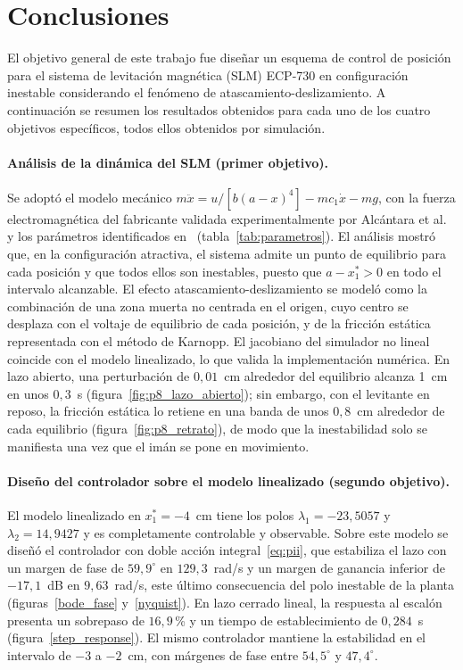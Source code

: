 \section{Conclusiones}

El objetivo general de este trabajo fue diseñar un esquema de control de posición para el sistema de levitación magnética (SLM) ECP-730 en configuración inestable considerando el fenómeno de atascamiento-deslizamiento. A continuación se resumen los resultados obtenidos para cada uno de los cuatro objetivos específicos, todos ellos obtenidos por simulación.

\paragraph{Análisis de la dinámica del SLM (primer objetivo).}
Se adoptó el modelo mecánico $m\ddot{x} = u/[b(a-x)^4] - m c_1\dot{x} - mg$, con la fuerza electromagnética del fabricante validada experimentalmente por Alcántara et al.~\cite{alcantara} y los parámetros identificados en~\cite{diana_tesis} (tabla~\ref{tab:parametros}). El análisis mostró que, en la configuración atractiva, el sistema admite un punto de equilibrio para cada posición y que todos ellos son inestables, puesto que $a - x_1^* > 0$ en todo el intervalo alcanzable. El efecto atascamiento-deslizamiento se modeló como la combinación de una zona muerta no centrada en el origen, cuyo centro se desplaza con el voltaje de equilibrio de cada posición, y de la fricción estática representada con el método de Karnopp. El jacobiano del simulador no lineal coincide con el modelo linealizado, lo que valida la implementación numérica. En lazo abierto, una perturbación de $0{,}01$~cm alrededor del equilibrio alcanza 1~cm en unos $0{,}3$~s (figura~\ref{fig:p8_lazo_abierto}); sin embargo, con el levitante en reposo, la fricción estática lo retiene en una banda de unos $0{,}8$~cm alrededor de cada equilibrio (figura~\ref{fig:p8_retrato}), de modo que la inestabilidad solo se manifiesta una vez que el imán se pone en movimiento.

\paragraph{Diseño del controlador sobre el modelo linealizado (segundo objetivo).}
El modelo linealizado en $x_1^*=-4$~cm tiene los polos $\lambda_1=-23{,}5057$ y $\lambda_2=14{,}9427$ y es completamente controlable y observable. Sobre este modelo se diseñó el controlador con doble acción integral~\eqref{eq:pii}, que estabiliza el lazo con un margen de fase de $59{,}9^\circ$ en $129{,}3$~rad/s y un margen de ganancia inferior de $-17{,}1$~dB en $9{,}63$~rad/s, este último consecuencia del polo inestable de la planta (figuras~\ref{bode_fase} y~\ref{nyquist}). En lazo cerrado lineal, la respuesta al escalón presenta un sobrepaso de $16{,}9$\,\% y un tiempo de establecimiento de $0{,}284$~s (figura~\ref{step_response}). El mismo controlador mantiene la estabilidad en el intervalo de $-3$ a $-2$~cm, con márgenes de fase entre $54{,}5^\circ$ y $47{,}4^\circ$.

